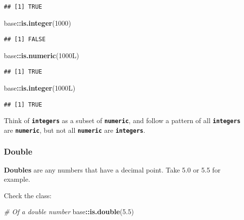 \documentclass[
]{book}
\newenvironment{Shaded}{\begin{snugshade}}{\end{snugshade}}
\newcommand{\CommentTok}[1]{\textcolor[rgb]{0.56,0.35,0.01}{\textit{#1}}}
\newcommand{\DataTypeTok}[1]{\textcolor[rgb]{0.13,0.29,0.53}{#1}}
\newcommand{\DecValTok}[1]{\textcolor[rgb]{0.00,0.00,0.81}{#1}}
\newcommand{\FloatTok}[1]{\textcolor[rgb]{0.00,0.00,0.81}{#1}}
\newcommand{\FunctionTok}[1]{\textcolor[rgb]{0.13,0.29,0.53}{\textbf{#1}}}
\newcommand{\NormalTok}[1]{#1}
\newcommand{\SpecialCharTok}[1]{\textcolor[rgb]{0.81,0.36,0.00}{\textbf{#1}}}
\begin{document}
\begin{verbatim}
## [1] TRUE
\end{verbatim}

\begin{Shaded}
\begin{Highlighting}[]
\NormalTok{base}\SpecialCharTok{::}\FunctionTok{is.integer}\NormalTok{(}\DecValTok{1000}\NormalTok{)}
\end{Highlighting}
\end{Shaded}

\begin{verbatim}
## [1] FALSE
\end{verbatim}

\begin{Shaded}
\begin{Highlighting}[]
\NormalTok{base}\SpecialCharTok{::}\FunctionTok{is.numeric}\NormalTok{(}\DecValTok{1000}\DataTypeTok{L}\NormalTok{)}
\end{Highlighting}
\end{Shaded}

\begin{verbatim}
## [1] TRUE
\end{verbatim}

\begin{Shaded}
\begin{Highlighting}[]
\NormalTok{base}\SpecialCharTok{::}\FunctionTok{is.integer}\NormalTok{(}\DecValTok{1000}\DataTypeTok{L}\NormalTok{)}
\end{Highlighting}
\end{Shaded}

\begin{verbatim}
## [1] TRUE
\end{verbatim}

Think of \textbf{\texttt{integers}} as a subset of \textbf{\texttt{numeric}}, and follow a pattern of all \textbf{\texttt{integers}} are \textbf{\texttt{numeric}}, but not all \textbf{\texttt{numeric}} are \textbf{\texttt{integers}}.

\subsubsection{Double}\label{sec:double}

\textbf{Doubles} are any numbers that have a decimal point. Take 5.0 or 5.5 for example.

Check the class:

\begin{Shaded}
\begin{Highlighting}[]
\CommentTok{\# Of a double number}
\NormalTok{base}\SpecialCharTok{::}\FunctionTok{is.double}\NormalTok{(}\FloatTok{5.5}\NormalTok{)}
\end{Highlighting}
\end{Shaded}
\end{document}
